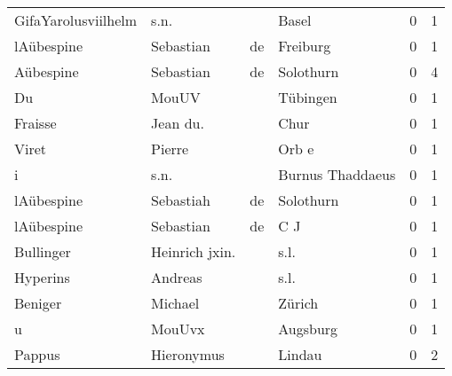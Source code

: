 \begin{tabular}{llllrr}
      GifaYarolusviilhelm &                               s.n. &             &                                       Basel &          0 &         1 \\
               lAübespine &                          Sebastian &          de &                                    Freiburg &          0 &         1 \\
                Aübespine &                          Sebastian &          de &                                   Solothurn &          0 &         4 \\
                       Du &                              MouUV &             &                                    Tübingen &          0 &         1 \\
                  Fraisse &                           Jean du. &             &                                        Chur &          0 &         1 \\
                    Viret &                             Pierre &             &                                       Orb e &          0 &         1 \\
                        i &                               s.n. &             &                            Burnus Thaddaeus &          0 &         1 \\
               lAübespine &                          Sebastiah &          de &                                   Solothurn &          0 &         1 \\
               lAübespine &                          Sebastian &          de &                                         C J &          0 &         1 \\
                Bullinger &                     Heinrich jxin. &             &                                        s.l. &          0 &         1 \\
                 Hyperins &                            Andreas &             &                                        s.l. &          0 &         1 \\
                  Beniger &                            Michael &             &                                      Zürich &          0 &         1 \\
                        u &                             MouUvx &             &                                    Augsburg &          0 &         1 \\
                   Pappus &                         Hieronymus &             &                                      Lindau &          0 &         2 \\

\end{tabular}
